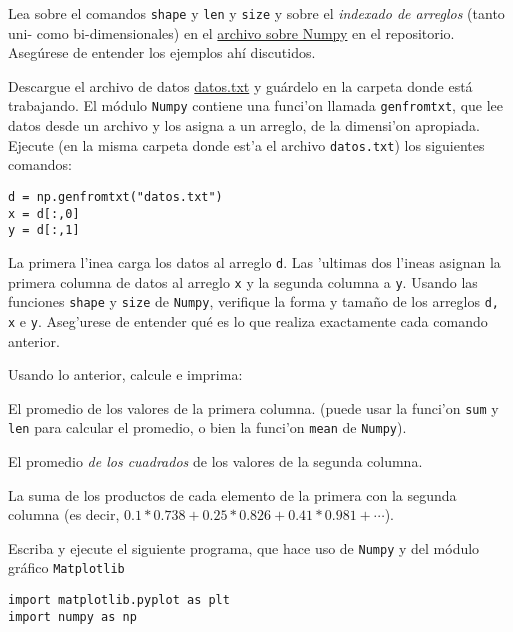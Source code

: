 \documentclass[11pt]{exam}
\begin{document}
\begin{questions}
\item Lea sobre el comandos \texttt{shape} y \texttt{len} y \texttt{size} y sobre el\textit{ indexado de arreglos} (tanto uni- como bi-dimensionales) en el \href{https://github.com/gfrubi/CC/blob/master/Python/02-Numpy.ipynb}{archivo sobre Numpy} en el repositorio. Asegúrese de entender los ejemplos ahí discutidos.

\item Descargue el archivo de datos \href{https://udec.instructure.com/courses/29314/files/folder/guias?preview=2014739}{datos.txt} y guárdelo en la carpeta donde está trabajando. El módulo \texttt{Numpy} contiene una funci'on llamada \texttt{genfromtxt}, que lee datos desde un archivo y los asigna a un arreglo, de la dimensi'on apropiada. Ejecute (en la misma carpeta donde est'a el archivo \texttt{datos.txt}) los siguientes comandos:

\begin{verbatim}
d = np.genfromtxt("datos.txt")
x = d[:,0]
y = d[:,1]
\end{verbatim}

La primera l'inea carga los datos al arreglo \texttt{d}. Las 'ultimas dos l'ineas asignan la primera columna de datos al arreglo \texttt{x} y la segunda columna a \texttt{y}. Usando las funciones \texttt{shape} y \texttt{size} de \texttt{Numpy}, verifique la forma y tama\~no de los arreglos \texttt{d, x} e \texttt{y}. Aseg'urese de entender qué es lo que realiza exactamente cada comando anterior.

\item Usando lo anterior, calcule e imprima:
\begin{parts}
\item El promedio de los valores de la primera columna. (puede usar la funci'on \texttt{sum} y \texttt{len} para calcular el promedio, o bien la funci'on \texttt{mean} de \texttt{Numpy}).
\item El promedio \textit{de los cuadrados} de los valores de la segunda columna.
\item La suma de los productos de cada elemento de la primera con la segunda columna (es decir, $0.1*0.738 + 0.25 *	0.826 + 0.41 * 0.981 +\cdots$).
\end{parts}

\item Escriba y ejecute el siguiente programa, que hace uso de \texttt{Numpy} y del módulo gráfico \texttt{Matplotlib}

\begin{verbatim}
import matplotlib.pyplot as plt
import numpy as np


\end{verbatim}
\end{questions}
\end{document}
